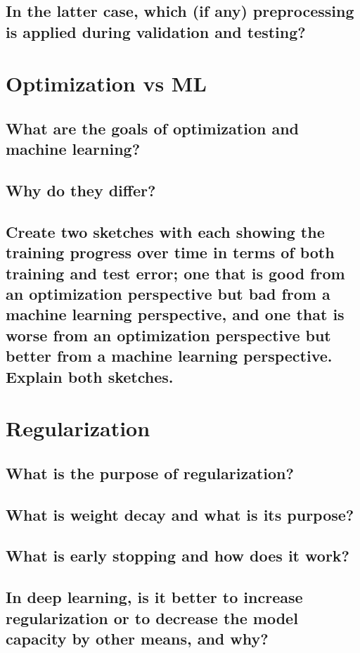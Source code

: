 \subsection{In the latter case, which (if any) preprocessing is applied during validation and testing?}

\section{Optimization vs ML}

\subsection{What are the goals of optimization and machine learning?}

\subsection{Why do they differ?}

\subsection{Create two sketches with each showing the training progress over time in terms of both training and test error; one that is good from an optimization perspective but bad from a machine learning perspective, and one that is worse from an optimization perspective but better from a machine learning perspective. Explain both sketches.}

\section{Regularization}

\subsection{What is the purpose of regularization?}

\subsection{What is weight decay and what is its purpose?}

\subsection{What is early stopping and how does it work?}

\subsection{In deep learning, is it better to increase regularization or to decrease the model capacity by other means, and why?}

